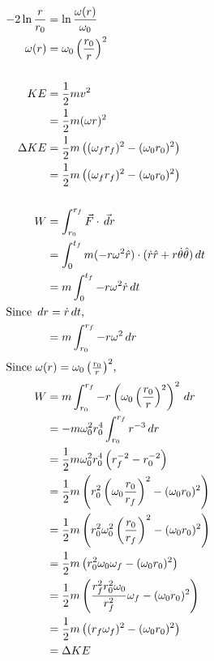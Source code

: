 \documentclass{esg8012pset}
\renewcommand{\d}{\,d}
\begin{document}
\begin{solution}
\begin{align*}
  -2\ln\frac{r}{r_0} & = \ln\frac{\omega(r)}{\omega_0} \\
  \omega(r) & = \omega_0 \left(\frac{r_0}{r}\right)^2\\
  \\
  KE & = \frac{1}{2}mv^2 \\
    & = \frac{1}{2}m(\omega r)^2 \\
  \Delta KE & = \frac{1}{2}m\left((\omega_f r_f)^2 - (\omega_0 r_0)^2\right) \\
    & = \frac{1}{2}m\left((\omega_f r_f)^2 - (\omega_0 r_0)^2\right) \\
  \\
  W & = \int_{r_0}^{r_f} \vec F\cdot \vec {\d r} \\
    & = \int_{0}^{t_f} m(-r\omega^2\hat r)\cdot(\dot r\hat r + r\dot\theta\hat\theta)\d t \\
    & = m\int_{0}^{t_f} -r\omega^2\dot r \d t \\
  \intertext{Since $\d r = \dot r\d t$,}
    & = m\int_{r_0}^{r_f} -r\omega^2 \d r \\
  \intertext{Since $\omega(r) = \omega_0 \left(\frac{r_0}{r}\right)^2$,}
  W & = m\int_{r_0}^{r_f} -r\left(\omega_0 \left(\frac{r_0}{r}\right)^2\right)^2 \d r \\
    & = -m\omega_0^2r_0^4\int_{r_0}^{r_f} r^{-3} \d r \\
    & = \frac{1}{2}m\omega_0^2r_0^4\left(r_f^{-2} - r_0^{-2}\right) \\
    & = \frac{1}{2}m\left(r_0^2\left(\omega_0\frac{r_0}{r_f}\right)^{2} - (\omega_0 r_0)^2\right) \\
    & = \frac{1}{2}m\left(r_0^2\omega_0^2\left(\frac{r_0}{r_f}\right)^{2} - (\omega_0 r_0)^2\right) \\
    & = \frac{1}{2}m\left(r_0^2\omega_0\omega_f - (\omega_0 r_0)^2\right) \\
    & = \frac{1}{2}m\left(\frac{r_f^2r_0^2\omega_0}{r_f^2}\omega_f - (\omega_0 r_0)^2\right) \\
    & = \frac{1}{2}m\left((r_f\omega_f)^2 - (\omega_0 r_0)^2\right) \\
    & = \Delta KE
  \end{align*}%

\end{solution}
\end{document}
